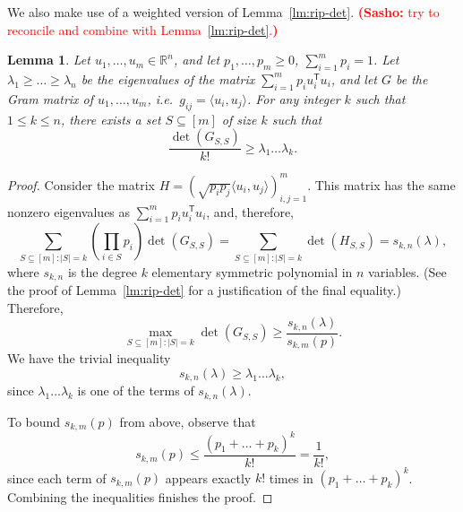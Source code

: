 \documentclass[11pt]{article}
\newtheorem{lemma}[theorem]{Lemma}
\newcommand{\R}{{\mathbb{R}}}
\newcommand{\T}{\mathsf T}
\newcommand{\notename}[2]{{\textcolor{red}{{\bf (#1:} {#2}{\bf ) }}}}
\newcommand{\notename}[2]{{\textcolor{red}{\footnotesize{\bf (#1:} {#2}{\bf ) }}}}
\newcommand{\snote}[1]{{\notename{Sasho}{#1}}}
\newcommand{\notename}[2]{{}}
\newcommand{\snote}[1]{}
\begin{document}
We also make use of a weighted version of Lemma~\ref{lm:rip-det}.
\snote{try to reconcile and combine with Lemma~\ref{lm:rip-det}.}
\begin{lemma}\label{lm:rip-det-weighted}
  Let $u_1, \ldots, u_m \in \R^n$, and let $p_1, \ldots, p_m \ge 0$,
  $\sum_{i = 1}^mp_i = 1$. Let $\lambda_1 \ge \ldots \ge \lambda_n$ be
  the eigenvalues of the matrix $\sum_{i=1}^m{p_i u_i^\T u_i}$, and
  let $G$ be the Gram matrix of $u_1, \ldots, u_m$, i.e.~$g_{ij} =
  \langle u_i, u_j\rangle$. For any integer $k$ such that $1 \le k \le
  n$, there exists a set $S \subseteq [m]$ of size $k$ such that
  \[
  \frac{\det(G_{S,S})}{k!} \ge\lambda_1 \ldots \lambda_k. 
  \]
\end{lemma}
\begin{proof}
  Consider the matrix $H = (\sqrt{p_ip_j}\langle u_i, u_j
  \rangle)_{i,j = 1}^m$. This matrix has the same nonzero eigenvalues as
  $\sum_{i=1}^m{p_i u_i^\T u_i}$, and, therefore,
  \[
  \sum_{S \subseteq [m]: |S| = k}{\left(\prod_{i \in S}{p_i}\right)\det(G_{S,S})}
  = \sum_{S \subseteq [m]: |S| = k}\det(H_{S,S}) = s_{k,n}(\lambda),
  \]
  where $s_{k,n}$ is the degree $k$ elementary symmetric polynomial in $n$
  variables. (See the proof of Lemma~\ref{lm:rip-det} for a
  justification of the final equality.) Therefore, 
  \[
  \max_{S \subseteq [m]: |S| = k}\det(G_{S,S}) 
  \ge \frac{s_{k,n}(\lambda)}{s_{k,m}(p)}. 
  \]
  We have the trivial inequality
  \[
  s_{k,n}(\lambda) \ge \lambda_1 \ldots \lambda_k,
  \]
  since $\lambda_1 \ldots \lambda_k$ is one of the terms of
  $s_{k,n}(\lambda)$. 
  
  To bound $s_{k,m}(p)$ from above, observe that
  \[
  s_{k,m}(p) \le \frac{(p_1 + \ldots + p_k)^k}{k!} = \frac{1}{k!},
  \]
  since each term of $s_{k,m}(p)$ appears exactly $k!$ times in 
  $(p_1 + \ldots + p_k)^k$.  Combining the inequalities finishes the proof. 
\end{proof}
\end{document}
